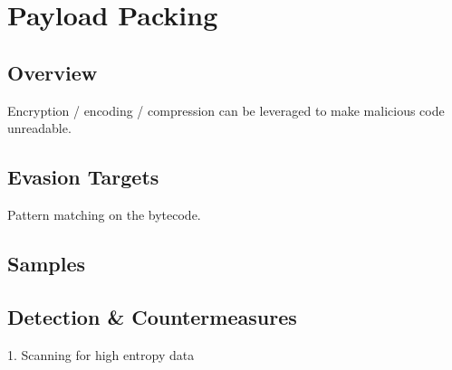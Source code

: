 \section{Payload Packing}

\subsection{Overview}

Encryption / encoding / compression can be leveraged to make malicious code unreadable.

\subsection{Evasion Targets}

Pattern matching on the bytecode.

\subsection{Samples}

\subsection{Detection \& Countermeasures}

1. Scanning for high entropy data
